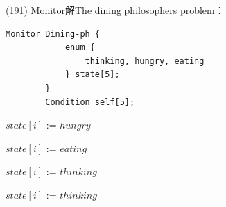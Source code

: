 \begin{theorem}{(191)} Monitor解The dining philosophers problem：
    \begin{lstlisting}[caption={Data structure (The dining philosophers problem (Monitor)).}, captionpos=b, mathescape=true]
        Monitor Dining-ph {
            enum {
                thinking, hungry, eating
            } state[5];
        } 
        Condition self[5];
    \end{lstlisting}
    \begin{algorithm}[H]
        \caption{$pickup(i)$.}
        \begin{algorithmic}[1]
                \State $state[i]$ := $hungry$
                \State {}
                    \State {}
                \EndIf
            \EndFunction
        \end{algorithmic}
    \end{algorithm}
    \begin{algorithm}[H]
        \caption{$test(i)$.}
        \begin{algorithmic}[1]
                    \State $state[i]$ := $eating$
                    \State {}
                \EndIf
            \EndFunction
        \end{algorithmic}
    \end{algorithm}
    \begin{algorithm}[H]
        \caption{$putdown(i)$.}
        \begin{algorithmic}[1]
                \State $state[i]$ := $thinking$
                \State {}
                \State {}
            \EndFunction
        \end{algorithmic}
    \end{algorithm}
    \begin{algorithm}[H]
        \caption{$initialization\_code(i)$.}
        \begin{algorithmic}[1]
             
                    \State $state[i]$ := $thinking$
                \EndFor
            \EndFunction
        \end{algorithmic}

\end{algorithm}
\end{theorem}
